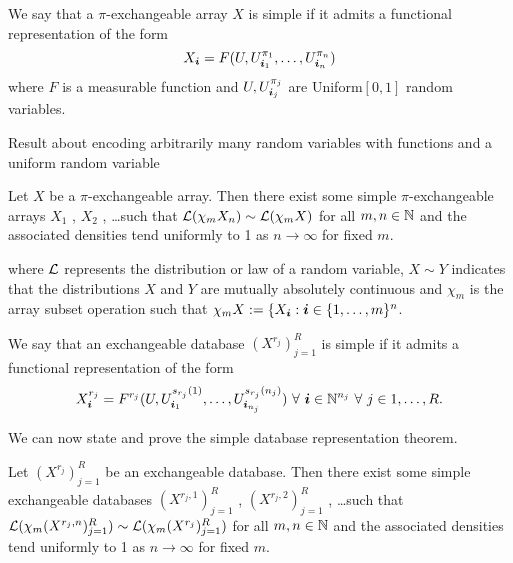 We say that a $\pi$-exchangeable array $X$ is simple if it admits a functional representation of the form
\begin{equation}
  X_{\bm{i}} = F(U, U^{\pi_1}_{\bm{i}_1}, \dots, U^{\pi_n}_{\bm{i}_n})
\end{equation}
where $F$ is a measurable function and $U, U^{\pi_j}_{\bm{i}_j}$ are \iid Uniform$[0,1]$ random variables.

\begin{prop}
  \label{prop:hypercube}
  Result about encoding arbitrarily many random variables with functions and a uniform random variable
\end{prop}

\begin{thm}
  \label{thm:piex}
  Let $X$ be a $\pi$-exchangeable array.
  Then there exist some simple $\pi$-exchangeable arrays $X_1$ , $X_2$ , \dots such that
  $\mathcal{L}(\chi_m X_n) \sim \mathcal{L}(\chi_m X)$ for all $m,n \in \mathbb{N}$ and the associated densities tend
  uniformly to 1 as $n \to \infty$ for fixed $m$.
\end{thm}

where $\mathcal{L}$ represents the distribution or law of a random variable, $X \sim Y$ indicates that the distributions $X$ and $Y$ are mutually absolutely continuous and $\chi_m$ is the array subset operation such that $\chi_m X := \{X_{\bm{i}} : \bm{i} \in \{1,\dots,m\}^n$.

We say that an exchangeable database $(X^{r_j})_{j=1}^R$ is simple if it admits a functional representation of the form
\begin{equation}
  X^{r_j}_{\bm{i}} = F^{r_j}(U, U^{s_{r_j}(1)}_{\bm{i}_1},\dots,U^{s_{r_j}(n_j)}_{\bm{i}_{n_j}}) \,\, \forall \,\, \bm{i} \in \mathbb{N}^{n_j} \,\, \forall \,\, j \in {1,\dots,R}.
\end{equation}

We can now state and prove the simple database representation theorem.

\begin{thm}
  \label{thm:simple-database}
  Let $(X^{r_j})_{j=1}^R$ be an exchangeable database.
  Then there exist some simple exchangeable databases $(X^{r_j,1})_{j=1}^R$ , $(X^{r_j,2})_{j=1}^R$ , \dots such that
  $\mathcal{L}(\chi_m (X^{r_j,n})_{j=1}^R) \sim \mathcal{L}(\chi_m (X^{r_j})_{j=1}^R)$ for all $m,n \in \mathbb{N}$ and the associated densities tend
  uniformly to 1 as $n \to \infty$ for fixed $m$.
\end{thm}

